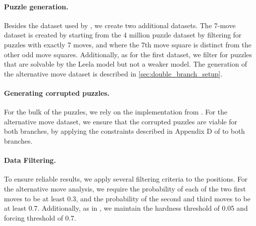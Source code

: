 \documentclass{article}
\begin{document}
\paragraph{Puzzle generation.} Besides the dataset used by \citet{jenner2024evidence}, we create two additional datasets. The 7-move dataset is created by starting from the 4 million puzzle dataset by filtering for puzzles with exactly 7 moves, and where the 7th move square is distinct from the other odd move squares. Additionally, as for the first dataset, we filter for puzzles that are solvable by the Leela model but not a weaker model. The generation of the alternative move dataset is described in \cref{sec:double_branch_setup}.

\paragraph{Generating corrupted puzzles.} For the bulk of the puzzles, we rely on the implementation from \citet{jenner2024evidence}. For the alternative move dataset, we ensure that the corrupted puzzles are viable for both branches, by applying the constraints described in Appendix D of \citet{jenner2024evidence} to both branches.

\paragraph{Data Filtering.} To ensure reliable results, we apply several filtering criteria to the positions. For the alternative move analysis, we require the probability of each of the two first moves to be at least 0.3, and the probability of the second and third moves to be at least 0.7. Additionally, as in \citet{jenner2024evidence}, we maintain the hardness threshold of 0.05 and forcing threshold of 0.7.
\end{document}
